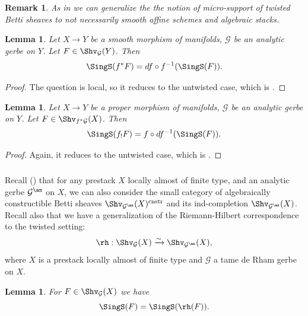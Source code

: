 \documentclass[9pt]{amsart}
\newcommand{\cG}{{\mathcal G}}
\newtheorem{lm}[subsubsection]{Lemma}
\newtheorem{rem}[subsubsection]{Remark}
\numberwithin{equation}{section}
\begin{document}
	\begin{rem}
		As in \cite[A.3.3-A.3.6]{GKRV} we can generalize the the notion of micro-support of twisted Betti sheaves to not necessarily smooth affine schemes and algebraic stacks.
	\end{rem}
	
	\begin{lm}\cite[5.4.5]{KS}
		Let $X \rightarrow Y$ be a smooth morphism of manifolds, $\cG$ be an analytic gerbe on $Y$. Let $F \in \Shv_{\cG}(Y)$. Then
		$$\SingS(f^*F) = df \circ f^{-1}(\SingS(F)).$$	
	\end{lm}
	
	\begin{proof}
		The question is local, so it reduces to the untwisted case, which is \cite[Proposition 5.4.5]{KS}.
	\end{proof}
	
	\begin{lm}\cite[5.4.4]{KS}
		Let $X \rightarrow Y$ be a proper morphism of manifolds, $\cG$ be an analytic gerbe on $Y$. Let $F \in \Shv_{f^*\cG}(X)$. Then
		$$\SingS(f_!F) = f\circ df^{-1}(\SingS(F)).$$
	\end{lm}
	
	\begin{proof}
		Again, it reduces to the untwisted case, which is \cite[Proposition 5.4.4]{KS}.
	\end{proof}
	
	\subsubsection{} Recall (\cite[13.2]{CF}) that for any prestack $X$ locally almost of finite type, and an analytic gerbe $\cG^{\an}$ on $X$, we can also consider the small category of algebraically constructible Betti sheaves $\Shv_{\cG^{\an}}(X)^{\operatorname{cnstr}}$ and its ind-completion $\Shv_{\cG^{\an}}(X)$. Recall also that we have \cite[Corollary 13.3.1]{CF} a generalization of the Riemann-Hilbert correspondence to the twisted setting:
	\begin{equation}\label{RH}
	\rh: \Shv_{\cG}(X) \xrightarrow{\sim} \Shv_{\cG^{\an}}(X),
	\end{equation}
	where $X$ is a prestack locally almost of finite type and $\cG$ a tame de Rham gerbe on $X$. 
	
	\begin{lm}
		For $F \in \Shv_{\cG}(X)$ we have 
		$$\SingS(F) = \SingS(\rh(F)).$$
	\end{lm}
	
\end{document}
